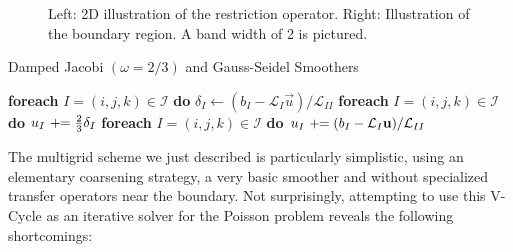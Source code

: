 \begin{figure}[t]
\caption{Left: 2D illustration of the restriction operator. Right: Illustration of the boundary region. A band width of 2 is pictured.}
\label{fig_transfer_stencils}
\end{figure}

\begin{algorithm}[h]
\caption{Damped Jacobi $(\omega\!=\!2/3)$ and Gauss-Seidel Smoothers}
\label{alg_smoothers}
\begin{algorithmic}[1]
\State \textbf{foreach} $I=(i,j,k)\in\mathcal{I}$ \textbf{do}
\State \hspace*{1.em}$\delta_I\gets(b_I-\mathcal{L}_I\vec{u})/\mathcal{L}_{II}$
\State \textbf{foreach} $I=(i,j,k)\in\mathcal{I}$ \textbf{do}
\State \hspace*{1.em}$u_I\,\,+\!\!=\frac{2}{3}\delta_I$
\EndProcedure
{}
\State \textbf{foreach} $I=(i,j,k)\in\mathcal{I}$ \textbf{do}
\State \hspace*{1.em}$u_I\,\,+\!\!=(b_I-\mathcal{L}_I\hbox{$\mathbf{u}$})/\mathcal{L}_{II}$
\EndProcedure
\end{algorithmic}
\end{algorithm}




The multigrid scheme we just described is particularly simplistic, using an elementary coarsening strategy, a very basic smoother and without specialized transfer operators near the
boundary. Not surprisingly, attempting to use this V-Cycle as an iterative solver for the Poisson problem reveals the following shortcomings:


